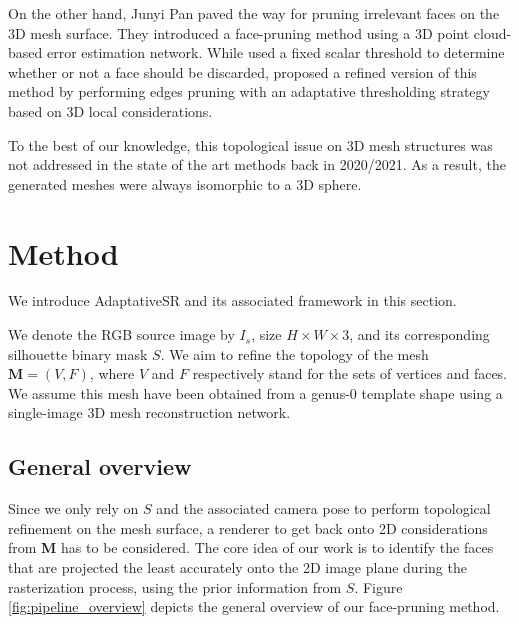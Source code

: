 On the other hand, Junyi Pan \etal \citep{pan2019deep} paved the way for pruning irrelevant faces on the 3D mesh surface. They introduced a face-pruning method using a 3D point cloud-based error estimation network. While \citep{pan2019deep} used a fixed scalar threshold to determine whether or not a face should be discarded, \citep{nie2020total3dunderstanding} proposed a refined version of this method by performing edges pruning with an adaptative thresholding strategy based on 3D local considerations.

To the best of our knowledge, this topological issue on 3D mesh structures was not addressed in the state of the art methods back in 2020/2021. As a result, the generated meshes were always isomorphic to a 3D sphere.

\section{Method}
\label{sec:method}

We introduce AdaptativeSR and its associated framework in this section. 

We denote the RGB source image by $I_s$, size $H\times W \times 3$, and its corresponding silhouette binary mask $S$. We aim to refine the topology of the mesh $\mathbf{M}=(V,F)$, where $V$ and $F$ respectively stand for the sets of vertices and faces. We assume this mesh have been obtained from a genus-0 template shape using a single-image 3D mesh reconstruction network. 

\subsection{General overview} Since we only rely on $S$ and the associated camera pose to perform topological refinement on the mesh surface, a renderer to get back onto 2D considerations from \textbf{M} has to be considered. The core idea of our work is to identify the faces that are projected the least accurately onto the 2D image plane during the rasterization process, using the prior information from $S$. Figure \ref{fig:pipeline_overview} depicts the general overview of our face-pruning method.

